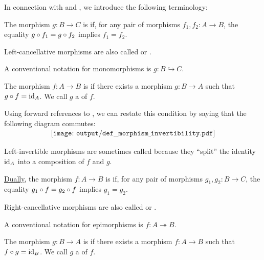 \begin{definition}\label{def:morphism_invertibility}
  In connection with  and , we introduce the following terminology:
  \begin{thmenum}
     The morphism \( g: B \to C \) is  if, for any pair of morphisms \( f_1, f_2: A \to B \), the equality \( g \bincirc f_1 = g \bincirc f_2 \) implies \( f_1 = f_2 \).

    Left-cancellative morphisms are also called  or .

    A conventional notation for monomorphisms is \( g: B \hookrightarrow C \).

     The morphism \( f: A \to B \) is  if there exists a morphism \( g: B \to A \) such that \( g \bincirc f = \id_A \). We call \( g \) a  of \( f \).

    Using forward references to , we can restate this condition by saying that the following diagram commutes:
    \begin{equation}\label{eq:def:morphism_invertibility/left_invertible}
      \begin{aligned}
        \texttt{[image: output/def\_\_morphism\_invertibility.pdf]}
      \end{aligned}
    \end{equation}

    Left-invertible morphisms are sometimes called  because they \enquote{split} the identity \( \operatorname{id}_A \) into a composition of \( f \) and \( g \).

     \hyperref[thm:categorical_principle_of_duality]{Dually}, the morphism \( f: A \to B \) is  if, for any pair of morphisms \( g_1, g_2: B \to C \), the equality \( g_1 \bincirc f = g_2 \bincirc f \) implies \( g_1 = g_2 \).

    Right-cancellative morphisms are also called  or .

    A conventional notation for epimorphisms is \( f: A \twoheadrightarrow B \).

     The morphism \( g: B \to A \) is  if there exists a morphism \( f: A \to B \) such that \( f \bincirc g = \id_B \). We call \( g \) a  of \( f \).


\end{thmenum}
\end{definition}
